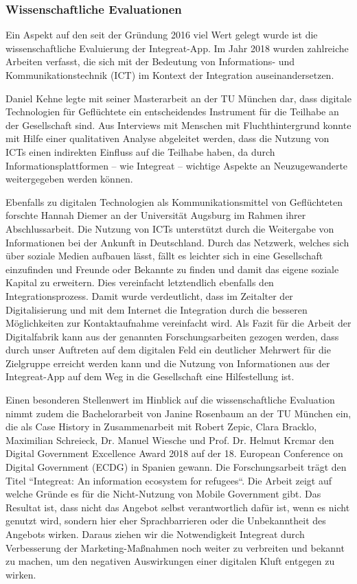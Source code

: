 \documentclass[12pt, a4paper]{article} %
\begin{document}
\hypertarget{wissenschaftliche-evaluationen}{%
\subsubsection{Wissenschaftliche
Evaluationen}\label{wissenschaftliche-evaluationen}}

Ein Aspekt auf den seit der Gründung 2016 viel Wert gelegt wurde ist die
wissenschaftliche Evaluierung der Integreat-App. Im Jahr 2018 wurden
zahlreiche Arbeiten verfasst, die sich mit der Bedeutung von
Informations- und Kommunikationstechnik (ICT) im Kontext der Integration
auseinandersetzen.

Daniel Kehne legte mit seiner Masterarbeit an der TU München dar, dass
digitale Technologien für Geflüchtete ein entscheidendes Instrument für
die Teilhabe an der Gesellschaft sind. Aus Interviews mit Menschen mit
Fluchthintergrund konnte mit Hilfe einer qualitativen Analyse abgeleitet
werden, dass die Nutzung von ICTs einen indirekten Einfluss auf die
Teilhabe haben, da durch Informationsplattformen – wie Integreat –
wichtige Aspekte an Neuzugewanderte weitergegeben werden können.

Ebenfalls zu digitalen Technologien als Kommunikationsmittel von
Geflüchteten forschte Hannah Diemer an der Universität Augsburg im
Rahmen ihrer Abschlussarbeit. Die Nutzung von ICTs unterstützt durch die
Weitergabe von Informationen bei der Ankunft in Deutschland. Durch das
Netzwerk, welches sich über soziale Medien aufbauen lässt, fällt es
leichter sich in eine Gesellschaft einzufinden und Freunde oder Bekannte
zu finden und damit das eigene soziale Kapital zu erweitern. Dies
vereinfacht letztendlich ebenfalls den Integrationsprozess. Damit wurde
verdeutlicht, dass im Zeitalter der Digitalisierung und mit dem Internet
die Integration durch die besseren Möglichkeiten zur Kontaktaufnahme
vereinfacht wird. Als Fazit für die Arbeit der Digitalfabrik kann aus
der genannten Forschungsarbeiten gezogen werden, dass durch unser
Auftreten auf dem digitalen Feld ein deutlicher Mehrwert für die
Zielgruppe erreicht werden kann und die Nutzung von Informationen aus
der Integreat-App auf dem Weg in die Gesellschaft eine Hilfestellung
ist.

Einen besonderen Stellenwert im Hinblick auf die wissenschaftliche
Evaluation nimmt zudem die Bachelorarbeit von Janine Rosenbaum an der TU
München ein, die als Case History in Zusammenarbeit mit Robert Zepic,
Clara Bracklo, Maximilian Schreieck, Dr. Manuel Wiesche und Prof. Dr.
Helmut Krcmar den Digital Government Excellence Award 2018 auf der 18.
European Conference on Digital Government (ECDG) in Spanien gewann. Die
Forschungsarbeit trägt den Titel “Integreat: An information ecosystem
for refugees“. Die Arbeit zeigt auf welche Gründe es für die
Nicht-Nutzung von Mobile Government gibt. Das Resultat ist, dass nicht
das Angebot selbst verantwortlich dafür ist, wenn es nicht genutzt wird,
sondern hier eher Sprachbarrieren oder die Unbekanntheit des Angebots
wirken. Daraus ziehen wir die Notwendigkeit Integreat durch Verbesserung
der Marketing-Maßnahmen noch weiter zu verbreiten und bekannt zu machen,
um den negativen Auswirkungen einer digitalen Kluft entgegen zu wirken.
\end{document}
